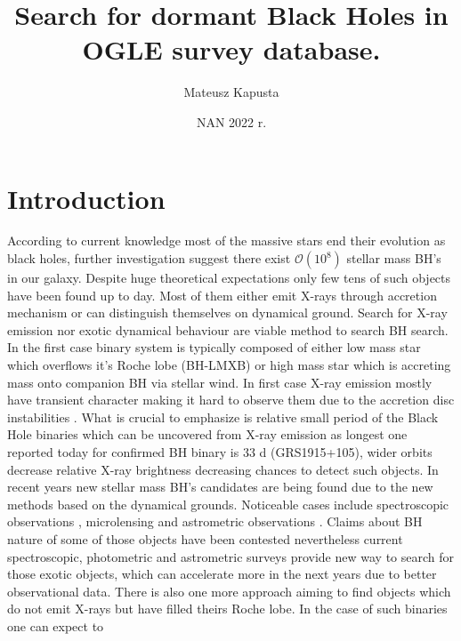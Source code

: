 \documentclass{pracalicmgr}
\author{Mateusz Kapusta}
\title{Search for dormant Black Holes in OGLE survey database.}
\date{NAN 2022 r.}
\begin{document}
    \maketitle
    \let\cleardoublepage\clearpage
\begin{abstract}
    \lipsum[2,7]
\end{abstract}

\tableofcontents

\chapter{Introduction}
\hspace{1cm} According to current knowledge most of the massive stars end their evolution as black holes, further investigation suggest there exist $\mathcal{O}(10^8)$ 
stellar mass BH's \citep{brown_scenario_1994} in our galaxy. Despite huge theoretical expectations only few tens of such objects have been found up to day. Most of them either emit X-rays through
accretion mechanism or can distinguish themselves on dynamical ground. Search for X-ray emission nor exotic dynamical behaviour are viable method to search BH search.
In the first case binary system is typically composed of either low mass star which overflows it's Roche lobe
(BH-LMXB) or high mass star which is accreting mass onto companion BH via stellar wind. In first case X-ray emission mostly have transient character \citep{bambi_transient_2016}
making it hard to observe them due to the accretion disc instabilities \citep{lasota_disc_2001}. What is crucial to emphasize is relative small period of the Black Hole binaries 
which can be uncovered from X-ray emission as longest one reported today for confirmed BH binary is $33$ d (GRS1915+105), wider orbits decrease relative X-ray brightness decreasing
chances to detect such objects.
In recent years new stellar mass BH's candidates are being found due to the new methods based on the dynamical grounds. Noticeable cases include spectroscopic observations 
\citep{liu_wide_2019,jayasinghe_unicorn_2021}, microlensing \citep{sahu_isolated_2022} and astrometric observations \citep{el-badry_sun-like_2022}. Claims about BH nature of 
some of those objects have been contested nevertheless current spectroscopic, photometric and astrometric surveys provide new way to search for those exotic objects, which can
accelerate more in the next years due to better observational data.
\vspace{1cm}
There is also one more approach aiming to find objects which do not emit X-rays but have filled theirs Roche lobe. In the case of such binaries one can expect to
\end{document}
